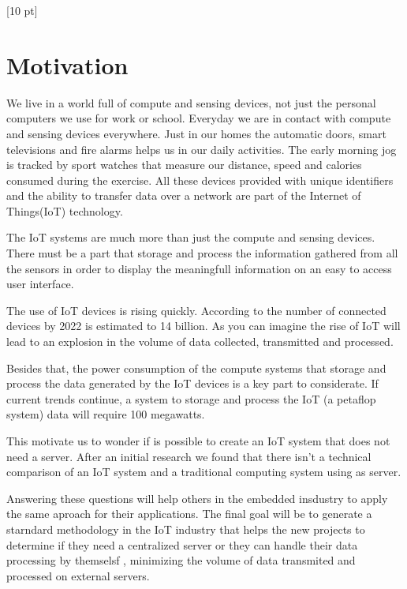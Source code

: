 \titleformat{\chapter}{\Huge\bfseries}{\thechapter}{0 pt}{\rule{340 pt}{3 pt}\\}
\titlespacing{\chapter}{100 pt}{-25 pt}{40 pt}[10 pt]	
\pagestyle{fancy}
\fancyhead[RO,RE]{\thepage}
\fancyfoot[CO,CE]{}

\chapter*{Motivation}

\normalsize
\noindent

We live in a world full of compute and sensing  devices, not just the personal
computers we use for work or school. Everyday we are in contact with compute
and sensing devices everywhere. Just in our homes the automatic doors, smart
televisions and fire alarms helps us in our daily activities. The early morning
jog is tracked by sport watches that measure our distance, speed and calories
consumed during the exercise. All these devices provided with unique identifiers 
and the ability to transfer data over a network are part of the Internet of
Things(IoT) technology. 

The IoT systems are much more than just the compute and sensing devices. There
must be a part that storage and process the information gathered from all the
sensors  in order to display the meaningfull information on an easy to access
user interface. 

The use of IoT devices is rising quickly. According to the number of connected
devices by 2022 is estimated to 14 billion\cite{Benkhelifa}. As you can imagine
the rise of IoT will lead to an explosion in the volume of data collected,
transmitted and processed.

Besides that, the power consumption of the compute systems that storage and
process the data generated by the IoT devices is a key part to considerate. If
current trends continue, a system to storage and process the IoT (a petaflop
system) data will require 100 megawatts. 



This motivate us to wonder if is possible to create an IoT system that does
not need a server. After an initial research we found that there isn't a
technical comparison of an  IoT system and a traditional computing system
using as server. 

Answering these questions will help others in the embedded insdustry to apply
the same aproach for their applications. The final goal will be to generate a
starndard methodology in the IoT industry that helps the new projects to
determine if they need a centralized  server or they can handle their data
processing by themselsf , minimizing the volume of data transmited and
processed on external servers. 


\clearpage
